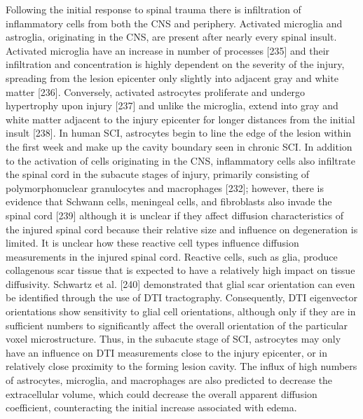 Following the initial response to spinal trauma there is infiltration of inflammatory cells from both the CNS and periphery.  Activated microglia and astroglia, originating in the CNS, are present after nearly every spinal insult.  Activated microglia have an increase in number of processes [235] and their infiltration and concentration is highly dependent on the severity of the injury, spreading from the lesion epicenter only slightly into adjacent gray and white matter [236].  Conversely, activated astrocytes proliferate and undergo hypertrophy upon injury [237] and unlike the microglia, extend into gray and white matter adjacent to the injury epicenter for longer distances from the initial insult [238].  In human SCI, astrocytes begin to line the edge of the lesion within the first week and make up the cavity boundary seen in chronic SCI.  In addition to the activation of cells originating in the CNS, inflammatory cells also infiltrate the spinal cord in the subacute stages of injury, primarily consisting of polymorphonuclear granulocytes and macrophages [232]; however, there is evidence that Schwann cells, meningeal cells, and fibroblasts also invade the spinal cord [239] although it is unclear if they affect diffusion characteristics of the injured spinal cord because their relative size and influence on degeneration is limited. 
It is unclear how these reactive cell types influence diffusion measurements in the injured spinal cord.  Reactive cells, such as glia, produce collagenous scar tissue that is expected to have a relatively high impact on tissue diffusivity.  Schwartz et al. [240] demonstrated that glial scar orientation can even be identified through the use of DTI tractography.  Consequently, DTI eigenvector orientations show sensitivity to glial cell orientations, although only if they are in sufficient numbers to significantly affect the overall orientation of the particular voxel microstructure.  Thus, in the subacute stage of SCI, astrocytes may only have an influence on DTI measurements close to the injury epicenter, or in relatively close proximity to the forming lesion cavity.  The influx of high numbers of astrocytes, microglia, and macrophages are also predicted to decrease the extracellular volume, which could decrease the overall apparent diffusion coefficient, counteracting the initial increase associated with edema. 
